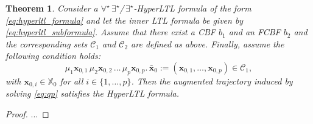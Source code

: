 \documentclass[letterpaper, 10 pt, conference]{ieeeconf}  %
\newtheorem{theorem}{Theorem}
\begin{document}
\begin{theorem}
    Consider a $\forall^\star \, \exists^\star$/$\, \exists^\star$-HyperLTL formula of the form \eqref{eq:hyperltl_formula} and let the inner LTL formula be given by \eqref{eq:hyperltl_subformula}. Assume that there exist a CBF $b_1$ and an FCBF $b_2$ and the corresponding sets $\mathcal{C}_1$ and $\mathcal{C}_2$ are defined as above. Finally, assume the following condition holds: 
    \begin{equation*}
        \mu_1 \mathbf{x}_{0, 1} \, \mu_2 \mathbf{x}_{0, 2} \, \dots \, \mu_p \mathbf{x}_{0, p}. \, \bar{\mathbf{x}}_0 :=(\mathbf{x}_{0, 1}, \dots, \mathbf{x}_{0, p}) \in \mathcal{C}_1,
    \end{equation*}
    with $\mathbf{x}_{0, i} \in \mathbb{X}_0$ for all $i \in \{1, \dots, p\}$.
    Then the augmented trajectory induced by solving \eqref{eq:qp} satisfies the HyperLTL formula.
\end{theorem}
\begin{proof}
    ...
\end{proof}


\end{document}
